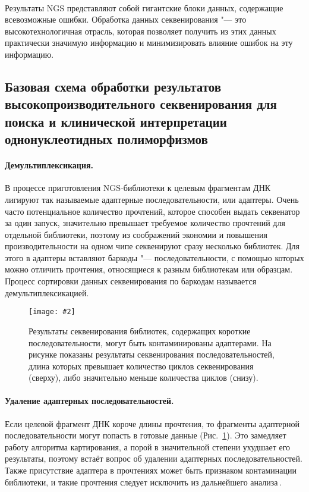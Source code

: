 \documentclass[a4paper,14pt]{extarticle}
\newcommand{\centerfigure}[5]
{\begin{figure}[#1]\centering\texttt{[image: \#2]}\caption{\label{#3}#4}\end{figure}}
\newcommand{\ecitep}[1]{\textenglish{\citep{#1}}}
\newcommand{\picref}[1]{Рис.~\ref{#1}}
\begin{document}
~

Результаты NGS представляют собой гигантские блоки данных, содержащие всевозможные ошибки.
Обработка данных секвенирования "--- это высокотехнологичная отрасль, которая позволяет получить из этих данных практически значимую информацию и минимизировать влияние ошибок на эту информацию.

\subsection{Базовая схема обработки результатов высокопроизводительного секвенирования для поиска и клинической интерпретации однонуклеотидных полиморфизмов}

\paragraph{Демультиплексикация.}
В процессе приготовления NGS\hyp{}библиотеки к целевым фрагментам ДНК лигируют так называемые адаптерные последовательности, или адаптеры.
Очень часто потенциальное количество прочтений, которое способен выдать секвенатор за один запуск, значительно превышает требуемое количество прочтений для отдельной библиотеки, поэтому из соображений экономии и повышения производительности на одном чипе секвенируют сразу несколько библиотек.
Для этого в адаптеры вставляют баркоды "--- последовательности, с помощью которых можно отличить прочтения, относящиеся к разным библиотекам или образцам.
Процесс сортировки данных секвенирования по баркодам называется демультиплексикацией.

\centerfigure{h}{Adapters.pdf}{fig:adapters}{Результаты секвенирования библиотек, содержащих короткие последовательности, могут быть контаминированы адаптерами. На рисунке показаны результаты секвенирования последовательностей, длина которых превышает количество циклов секвенирования (сверху), либо значительно меньше количества циклов (снизу).}{0.7}

\paragraph{Удаление адаптерных последовательностей.}
Если целевой фрагмент ДНК короче длины прочтения, то фрагменты адаптерной последовательности могут попасть в готовые данные (\picref{fig:adapters}).
Это замедляет работу алгоритма картирования, а порой в значительной степени ухудшает его результаты, поэтому встаёт вопрос об удалении адаптерных последовательностей.
Также присутствие адаптера в прочтениях может быть признаком контаминации библиотеки, и такие прочтения следует исключить из дальнейшего анализа\,\ecitep{Martin_2011}.
\end{document}
